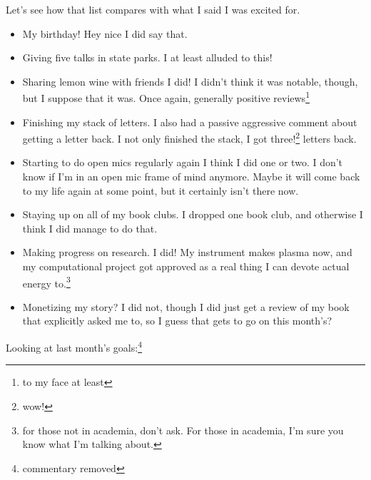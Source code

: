 \documentclass[12pt]{article}[titlepage]
\renewcommand{\,}{\textsuperscript{,}}
\begin{document}
Let's see how that list compares with what I said I was excited for.
\begin{itemize}
\item My birthday!
Hey nice I did say that.
\item Giving five talks in state parks.
I at least alluded to this!
\item Sharing lemon wine with friends
I did! I didn't think it was notable, though, but I suppose that it was. 
Once again, generally positive reviews\footnote{to my face at least}
\item Finishing my stack of letters.
I also had a passive aggressive comment about getting a letter back.
I not only finished the stack, I got three!\footnote{wow!} letters back.
\item Starting to do open mics regularly again
I think I did one or two.
I don't know if I'm in an open mic frame of mind anymore.
Maybe it will come back to my life again at some point, but it certainly isn't there now.
\item Staying up on all of my book clubs.
I dropped one book club, and otherwise I think I did manage to do that.
\item Making progress on research.
I did! My instrument makes plasma now, and my computational project got approved as a real thing I can devote actual energy to.\footnote{for those not in academia, don't ask.
For those in academia, I'm sure you know what I'm talking about.}
\item Monetizing my story?
I did not, though I did just get a review of my book that explicitly asked me to, so I guess that gets to go on this month's?
\end{itemize}
Looking at last month's goals:\footnote{commentary removed}
\end{document}
